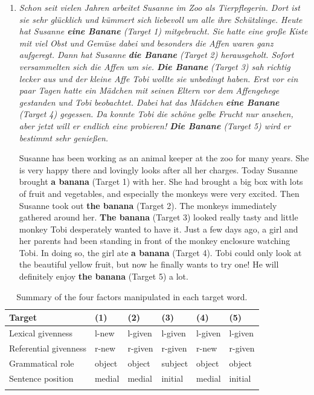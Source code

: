 \begin{enumerate}[resume*]
\item \label{itm:story_banane} \textit{Schon seit vielen Jahren arbeitet Susanne im Zoo als Tierpflegerin. Dort ist sie sehr glücklich und kümmert sich liebevoll um alle ihre Schützlinge. Heute hat Susanne \textbf{eine Banane} (Target 1) mitgebracht. Sie hatte eine große Kiste mit viel Obst und Gemüse dabei und besonders die Affen waren ganz aufgeregt. Dann hat Susanne \textbf{die Banane} (Target 2) herausgeholt. Sofort versammelten sich die Affen um sie. \textbf{Die Banane} (Target 3) sah richtig lecker aus und der kleine Affe Tobi wollte sie unbedingt haben. Erst vor ein paar Tagen hatte ein Mädchen mit seinen Eltern vor dem Affengehege gestanden und Tobi beobachtet. Dabei hat das Mädchen \textbf{eine Banane} (Target 4) gegessen. Da konnte Tobi die schöne gelbe Frucht nur ansehen, aber jetzt will er endlich eine probieren! \textbf{Die Banane} (Target 5) wird er bestimmt sehr genießen.}

Susanne has been working as an animal keeper at the zoo for many years. She is very happy there and lovingly looks after all her charges. Today Susanne brought \textbf{a banana} (Target 1) with her. She had brought a big box with lots of fruit and vegetables, and especially the monkeys were very excited. Then Susanne took out \textbf{the banana} (Target 2). The monkeys immediately gathered around her. \textbf{The banana} (Target 3) looked really tasty and little monkey Tobi desperately wanted to have it. Just a few days ago, a girl and her parents had been standing in front of the monkey enclosure watching Tobi. In doing so, the girl ate \textbf{a banana} (Target 4). Tobi could only look at the beautiful yellow fruit, but now he finally wants to try one! He will definitely enjoy \textbf{the banana} (Target 5) a lot.
\end{enumerate}

\begin{table}[]
\begin{tabular}{llllll}
\lsptoprule
Target                & (1) & (2) & (3) & (4) & (5) \\ \hline
Lexical givenness     & l-new               & l-given              & l-given               & l-given              & l-given              \\
Referential givenness & r-new               & r-given              & r-given               & r-new                & r-given              \\
Grammatical role      & object              & object               & subject               & object               & object               \\
Sentence position              & medial              & medial               & initial               & medial               & initial              \\
\lspbottomrule
\end{tabular}
\caption{Summary of the four factors manipulated in each target word.}
\label{table:summary_manipulations}
\end{table}

